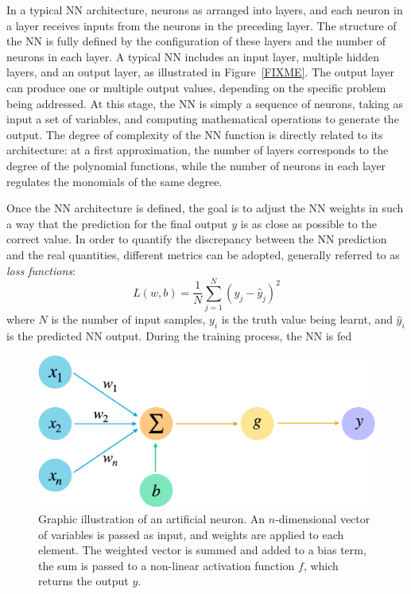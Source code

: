 In a typical NN architecture, neurons as arranged into layers, and each neuron in a layer receives inputs from the neurons in the preceding layer. 
The structure of the NN is fully defined by the configuration of these layers and the number of neurons in each layer. A typical NN includes an input layer, multiple hidden layers, and an output layer, as illustrated in Figure~\ref{FIXME}.
The output layer can produce one or multiple output values, depending on the specific problem being addressed. 
At this stage, the NN is simply a sequence of neurons, taking as input a set of variables, and computing mathematical operations to generate the output. The degree of complexity of the NN function is directly related to its architecture: at a first approximation, the number of layers corresponds to the degree of the polynomial functions, while the number of neurons in each layer regulates the monomials of the same degree. 

Once the NN architecture is defined, the goal is to adjust the NN weights in such a way that the prediction for the final output $y$ is as close as possible to the correct value. 
In order to quantify the discrepancy between the NN prediction and the real quantities, different metrics can be adopted, generally referred to as \textit{loss functions}:
\begin{equation}
    L(w,b)=\frac{1}{N}\sum_{j=1}^N(y_j-\hat{y}_j)^2
\end{equation}
where $N$ is the number of input samples, $y_i$ is the truth value being learnt, and $\hat{y}_i$ is the predicted NN output.
During the training process, the NN is fed 


\begin{figure}
    \centering
    \includegraphics[width=0.6\linewidth]{Figures/L1TP/Perceptron.pdf}
    \caption{Graphic illustration of an artificial neuron. An $n$-dimensional vector of variables is passed as input, and weights are applied to each element. The weighted vector is summed and added to a bias term, the sum is passed to a non-linear activation function $f$, which returns the output $y$.}
    \label{fig:Perceptron}
\end{figure}

